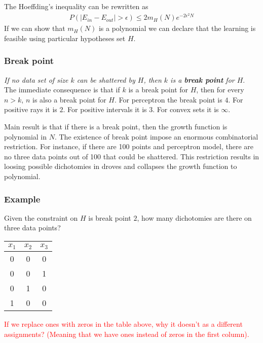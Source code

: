 \documentclass[class=article, crop=false]{standalone}
\numberwithin{equation}{section}
\begin{document}
The Hoeffding's inequality can be rewritten as
\begin{align}
    P(|E_{in}-E_{out}|>\epsilon)\leq 2m_H(N)e^{-2\epsilon^2 N}
\end{align}
If we can show that $m_H(N)$ is a polynomial we can declare that the learning is feasible using particular hypotheses set $H$.
\subsubsection{Break point}
\textit{If no data set of size $k$ can be shattered by $H$, then $k$ is a \textbf{break point} for $H$}.
The immediate consequence is that if $k$ is a break point for $H$, then for every $n>k$, $n$ is also a break point for $H$.
For perceptron the break point is $4$. For positive rays it is $2$. For positive intervals it is $3$. For convex sets it is $\infty$.

Main result is that if there is a break point, then the growth function is polynomial in $N$. The existence of break point impose an enormous combinatorial restriction. For instance, if there are 100 points and perceptron model, there are no three data points out of 100 that could be shattered. This restriction results in loosing possible dichotomies in droves and collapses the growth function to polynomial.
\subsubsection*{Example}
Given the constraint on $H$ is break point $2$, how many dichotomies are there on three data points?
\begin{center}
\begin{tabular}{| c | c | c | }
 \hline
 $x_1$ & $x_2$ & $x_3$  \\ \hline 
 0 & 0 & 0 \\ \hline
 0 & 0 & 1 \\ \hline
 0 & 1 & 0 \\ \hline
 1 & 0 & 0 \\ \hline
\end{tabular}
\end{center}
\textcolor{red}{If we replace ones with zeros in the table above, why it doesn't as a different assignments? (Meaning that we have ones instead of zeros in the first column).}

\end{document}
